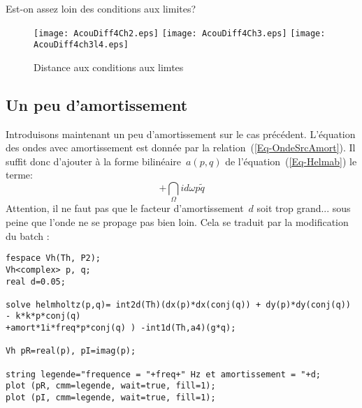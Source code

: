 Est-on assez loin des conditions aux limites?
\begin{flushright}
\end{flushright}
\begin{figure}[h!]
\centering
   \texttt{[image: AcouDiff4Ch2.eps]}\hfill
   \texttt{[image: AcouDiff4Ch3.eps]}\hfill
   \texttt{[image: AcouDiff4ch3l4.eps]}
\caption{Distance aux conditions aux limtes}\label{Fig-AcouDiff4Ch}
\end{figure}

\medskip
\subsection{Un peu d'amortissement}

Introduisons maintenant un peu d'amortissement sur le cas précédent. L'équation des ondes avec amortissement est donnée par la relation~(\ref{Eq-OndeSrcAmort}). Il suffit donc d'ajouter à la forme bilinéaire~$a(p,q)$ de l'équation~(\ref{Eq-Helmab}) le terme:
\begin{equation}
+\dint_\Omega id\omega p\tilde{q}
\end{equation}
Attention, il ne faut pas que le facteur d'amortissement~$d$ soit trop grand... sous peine que l'onde ne se propage pas bien loin. Cela se traduit par la modification du batch \freefem:
\begin{lstlisting}[firstnumber=14]
fespace Vh(Th, P2);
Vh<complex> p, q;
real d=0.05;

solve helmholtz(p,q)= int2d(Th)(dx(p)*dx(conj(q)) + dy(p)*dy(conj(q)) - k*k*p*conj(q) 
+amort*1i*freq*p*conj(q) ) -int1d(Th,a4)(g*q);

Vh pR=real(p), pI=imag(p);

string legende="frequence = "+freq+" Hz et amortissement = "+d;
plot (pR, cmm=legende, wait=true, fill=1);
plot (pI, cmm=legende, wait=true, fill=1);
\end{lstlisting}

